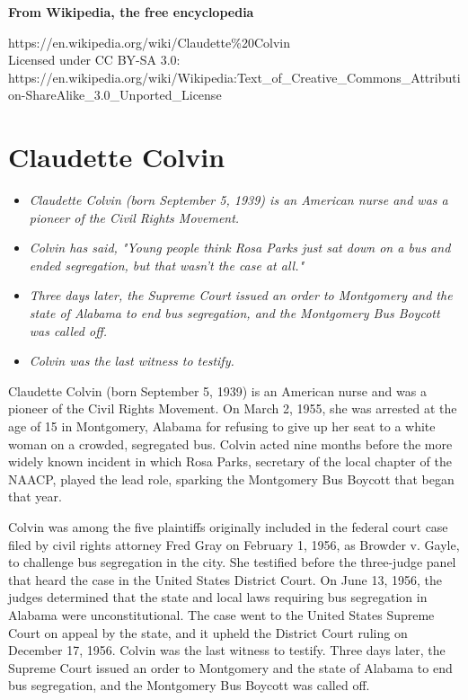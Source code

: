 \textbf{From Wikipedia, the free encyclopedia}

https://en.wikipedia.org/wiki/Claudette\%20Colvin\\
Licensed under CC BY-SA 3.0:\\
https://en.wikipedia.org/wiki/Wikipedia:Text\_of\_Creative\_Commons\_Attribution-ShareAlike\_3.0\_Unported\_License

\section{Claudette Colvin}\label{claudette-colvin}

\begin{itemize}
\item
  \emph{Claudette Colvin (born September 5, 1939) is an American nurse
  and was a pioneer of the Civil Rights Movement.}
\item
  \emph{Colvin has said, "Young people think Rosa Parks just sat down on
  a bus and ended segregation, but that wasn't the case at all."}
\item
  \emph{Three days later, the Supreme Court issued an order to
  Montgomery and the state of Alabama to end bus segregation, and the
  Montgomery Bus Boycott was called off.}
\item
  \emph{Colvin was the last witness to testify.}
\end{itemize}

Claudette Colvin (born September 5, 1939) is an American nurse and was a
pioneer of the Civil Rights Movement. On March 2, 1955, she was arrested
at the age of 15 in Montgomery, Alabama for refusing to give up her seat
to a white woman on a crowded, segregated bus. Colvin acted nine months
before the more widely known incident in which Rosa Parks, secretary of
the local chapter of the NAACP, played the lead role, sparking the
Montgomery Bus Boycott that began that year.

Colvin was among the five plaintiffs originally included in the federal
court case filed by civil rights attorney Fred Gray on February 1, 1956,
as Browder v. Gayle, to challenge bus segregation in the city. She
testified before the three-judge panel that heard the case in the United
States District Court. On June 13, 1956, the judges determined that the
state and local laws requiring bus segregation in Alabama were
unconstitutional. The case went to the United States Supreme Court on
appeal by the state, and it upheld the District Court ruling on December
17, 1956. Colvin was the last witness to testify. Three days later, the
Supreme Court issued an order to Montgomery and the state of Alabama to
end bus segregation, and the Montgomery Bus Boycott was called off.

